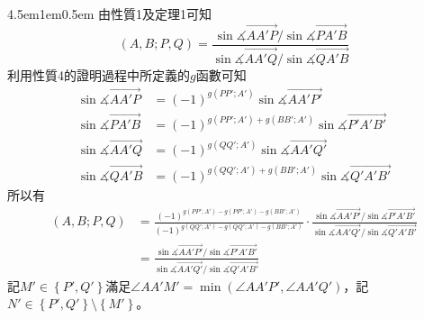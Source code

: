 \documentclass[12pt]{article}
\begin{document}
\begin{mybox}{4.5em}{1em}{0.5em}
    由性質1及定理1可知
    $$
        \left(A,B;P,Q\right)=\frac{\sin{\measuredangle{\overrightarrow{AA'P}}}/\sin{\measuredangle{\overrightarrow{PA'B}}}}{\sin{\measuredangle{\overrightarrow{AA'Q}}}/\sin{\measuredangle{\overrightarrow{QA'B}}}}
    $$
    利用性質4的證明過程中所定義的$g$函數可知
    \begin{align*}
        \sin{\measuredangle{\overrightarrow{AA'P}}}&=(-1)^{g\left(PP';A'\right)}\sin{\measuredangle{\overrightarrow{AA'P'}}}\\
        \sin{\measuredangle{\overrightarrow{PA'B}}}&=(-1)^{g\left(PP';A'\right)+g\left(BB';A'\right)}\sin{\measuredangle{\overrightarrow{P'A'B'}}}\\
        \sin{\measuredangle{\overrightarrow{AA'Q}}}&=(-1)^{g\left(QQ';A'\right)}\sin{\measuredangle{\overrightarrow{AA'Q'}}}\\
        \sin{\measuredangle{\overrightarrow{QA'B}}}&=(-1)^{g\left(QQ';A'\right)+g\left(BB';A'\right)}\sin{\measuredangle{\overrightarrow{Q'A'B'}}}
    \end{align*}
    所以有
    \begin{align*}
        \left(A,B;P,Q\right)&=\frac{(-1)^{g\left(PP';A'\right)-g\left(PP';A'\right)-g\left(BB';A'\right)}}{(-1)^{g\left(QQ';A'\right)-g\left(QQ';A'\right)-g\left(BB';A'\right)}}
        \cdot\frac{\sin{\measuredangle{\overrightarrow{AA'P'}}}/\sin{\measuredangle{\overrightarrow{P'A'B'}}}}{\sin{\measuredangle{\overrightarrow{AA'Q'}}}/\sin{\measuredangle{\overrightarrow{Q'A'B'}}}}\\
        &=\frac{\sin{\measuredangle{\overrightarrow{AA'P'}}}/\sin{\measuredangle{\overrightarrow{P'A'B'}}}}{\sin{\measuredangle{\overrightarrow{AA'Q'}}}/\sin{\measuredangle{\overrightarrow{Q'A'B'}}}}
    \end{align*}
    記$M'\in\left\{P',Q'\right\}$滿足$\angle{AA'M'}=\min{\left(\angle{AA'P'},\angle{AA'Q'}\right)}$，記$N'\in\left\{P',Q'\right\}\setminus\left\{M'\right\}$。


\end{mybox}
\end{document}
